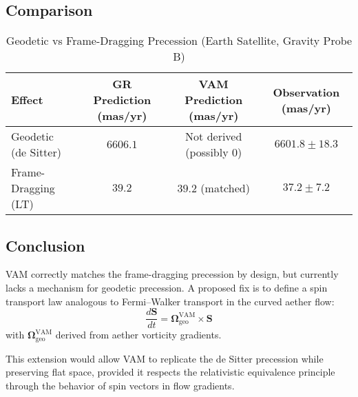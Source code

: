 \subsection*{Comparison}

\begin{table}[h!]
    \centering
    \caption{Geodetic vs Frame-Dragging Precession (Earth Satellite, Gravity Probe B)}
    \label{tab:geodetic}
    \begin{tabular}{lccc}
        \toprule
        Effect & GR Prediction (mas/yr) & VAM Prediction (mas/yr) & Observation (mas/yr) \\
        \midrule
        Geodetic (de Sitter) & $6606.1$ & Not derived (possibly $0$) & $6601.8 \pm 18.3$ \\
        Frame-Dragging (LT)  & $39.2$   & $39.2$ (matched)           & $37.2 \pm 7.2$ \\
        \bottomrule
    \end{tabular}
\end{table}

\subsection*{Conclusion}

VAM correctly matches the frame-dragging precession by design, but currently lacks a mechanism for geodetic precession. A proposed fix is to define a spin transport law analogous to Fermi--Walker transport in the curved aether flow:
\begin{equation}
    \frac{d\mathbf{S}}{dt} = \boldsymbol{\Omega}_{\text{geo}}^{\text{VAM}} \times \mathbf{S}
\end{equation}
with $\boldsymbol{\Omega}_{\text{geo}}^{\text{VAM}}$ derived from aether vorticity gradients.

This extension would allow VAM to replicate the de Sitter precession while preserving flat space, provided it respects the relativistic equivalence principle through the behavior of spin vectors in flow gradients.
